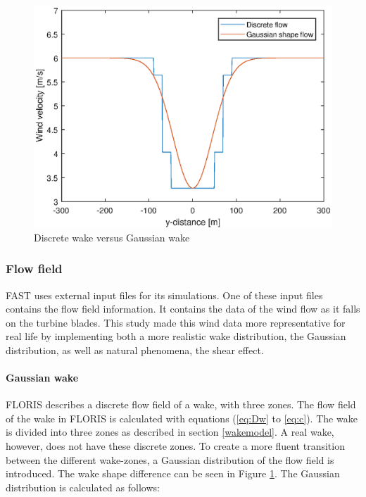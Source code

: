 \begin{figure}
  \includegraphics[width=\linewidth]{./Figures/PlotGausDiscWakeDWake180U6yaw0.eps} %
  \caption{Discrete wake versus Gaussian wake} %
  \label{fig:disgaus}
\end{figure}


\subsubsection{Flow field} \label{sec:flowfield}
FAST uses external input files for its simulations. One of these input files contains the flow field information. It contains the data of the wind flow as it falls on the turbine blades. This study made this wind data more representative for real life by implementing both a more realistic wake distribution, the Gaussian distribution, as well as natural phenomena, the shear effect.

\paragraph{Gaussian wake}
FLORIS describes a discrete flow field of a wake, with three zones. The flow field of the wake in FLORIS is calculated with equations (\ref{eq:Dw} to \ref{eq:c}). The wake is divided into three zones as described in section \ref{wakemodel}. A real wake, however, does not have these discrete zones. To create a more fluent transition between the different wake-zones, a Gaussian distribution of the flow field is introduced\cite{Bastankhah2016}. The wake shape difference can be seen in Figure \ref{fig:disgaus}.  The Gaussian distribution is calculated as follows: 

